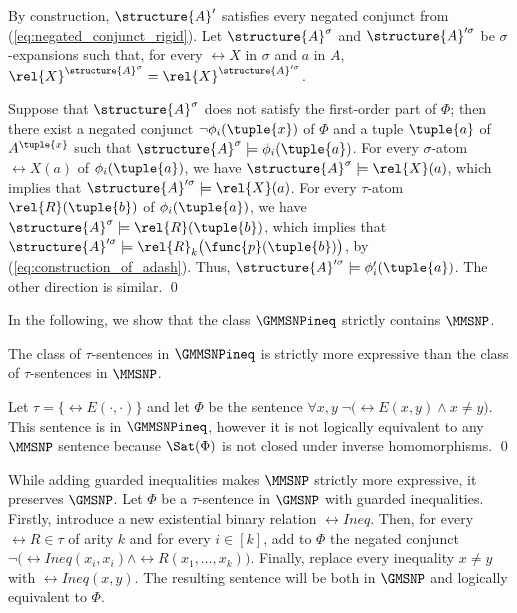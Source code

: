 \documentclass{lmcs}
\begin{document}
By construction, $\structure{A}'$ satisfies every negated conjunct from (\ref{eq:negated_conjunct_rigid}).
Let $\structure{A}^\sigma$ and $\structure{A}'^\sigma$ be $\sigma$-expansions such that, for every $\rel{X}$ in $\sigma$ and $a$ in $ A$,  $\rel{X}^{\structure{A}^\sigma}=\rel{X}^{\structure{A}'^\sigma}$.




Suppose that $\structure{A}^\sigma$ does not satisfy the first-order part of $\Phi$; then there exist a negated conjunct $\neg\phi_i(\tuple{x})$ of $\Phi$ and a tuple $\tuple{a}$ of $A^\tuple{x}$ such that $\structure{A}^\sigma\models\phi_i(\tuple{a})$. 
For every $\sigma$-atom $\rel{X}(a)$ of $\phi_i(\tuple{a})$, we have $\structure{A}^\sigma\models\rel{X}(a)$, which implies that $\structure{A}'^\sigma\models\rel{X}(a)$. 
For every $\tau$-atom $\rel{R}(\tuple{b})$ of $\phi_i(\tuple{a})$, we have $\structure{A}^\sigma\models\rel{R}(\tuple{b})$, which implies that $\structure{A}'^\sigma\models\rel{R}_k\bigl(\func{p}(\tuple{b})\bigr)$, by (\ref{eq:construction_of_adash}).
Thus, $\structure{A}'^\sigma\models\phi_i'(\tuple{a})$.
The other direction is similar.
\qed
\medskip




In the following, we show that the class $\GMMSNPineq$ strictly contains $\MMSNP$.
\begin{prop}
The class of $\tau$-sentences in $\GMMSNPineq$ is strictly more expressive than the class of $\tau$-sentences in $\MMSNP$.
\end{prop}
\proof
Let $\tau=\{\rel{E}(\cdot,\cdot)\}$ and let $\Phi$ be the sentence $\forall x,y\; \neg\bigl(\rel{E}(x,y)\wedge x\not=y\bigr)$.
This sentence is in $\GMMSNPineq$, however it is not logically equivalent to any $\MMSNP$ sentence because $\Sat(\Phi)$ is not closed under inverse homomorphisms.
\qed

\begin{rem}
While adding guarded inequalities makes $\MMSNP$ strictly more expressive, it preserves $\GMSNP$.
Let $\Phi$ be a $\tau$-sentence in $\GMSNP$ with guarded inequalities.
Firstly, introduce a new existential binary relation $\rel{Ineq}$.
Then, for every $\rel{R}\in\tau$ of arity $k$ and for every $i\in[k]$, add to $\Phi$ the negated conjunct $\neg\bigl(\rel{Ineq}(x_i,x_i)\wedge \rel{R}(x_1,\ldots,x_k)\bigr)$.
Finally, replace every inequality $x\not=y$ with $\rel{Ineq}(x,y)$.
The resulting sentence will be both in $\GMSNP$ and logically equivalent to $\Phi$.
\end{rem}
\end{document}
